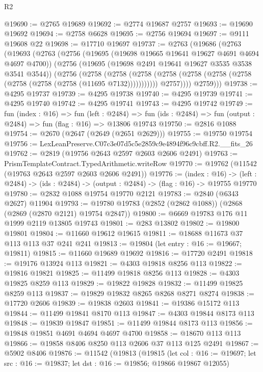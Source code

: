 \begin{lexlean}{R2}
\begin{coremodule}
@19690 := @2765 @19689
@19692 := @2774 @19687 @2757
@19693 := @19690 @19692
@19694 := @2758 @6628
@19695 := @2756 @19694
@19697 := @9111 @19608 @22
@19698 := @17710 @19697
@19737 := @2763
    (@19686
      (@2763
        (@19693
          (@2763
            (@2756
              (@19695 (@19698 @19665 @19641 @19627 @4691 @4694 @4697 @4700))
              (@2756
                (@19695 (@19698 @2491 @19641 @19627 @3535 @3538 @3541 @3544))
                (@2756
                  (@2758
                    (@2758
                      (@2758
                        (@2758 (@2758 (@2758 (@2758 (@2758 (@2758 (@2758 (@11695 @7132)))))))))))
                  @2757))))
          @2759)))
@19738 := @4295 @19737
@19739 := @4295 @19738
@19740 := @4295 @19739
@19741 := @4295 @19740
@19742 := @4295 @19741
@19743 := @4295 @19742
@19749 := fun (index : @16) =>
  fun (left : @2484) =>
  fun (ids : @2484) => fun (output : @2484) => fun (flag : @16) => @13806 @19743
@19750 := @2816 @1088
@19754 := @2670 (@2647 (@2649 (@2651 @2629)))
@19755 := @19750 @19754
@19756 := LexLeanPreserve.C07c3e07d5c5e2859c9e4894f96c9cbff.R2.__fits_26
@19762 := @2819 (@19756 @2643 @2597 @2603 @2606 @2491)
@19763 := PrismTemplateContract.TypedArithmetic.writeRow
@19770 := @19762 (@11542 (@19763 @2643 @2597 @2603 @2606 @2491))
@19776 := (index : @16) ->
  (left : @2484) -> (ids : @2484) -> (output : @2484) -> (flag : @16) -> @19755 @19770
@19780 := @2832 @1088 @19754 @19770 @2121
@19783 := @2840 (@6343 @2627) @11904
@19793 := @19780 @19783 (@2852 (@2862 @1088)) (@2868 (@2869 (@2870 @2121) @19754 @2847))
@19800 := @6669 @19783 @176 @11 @1999 @2119 @13805 @19743
@19801 := @283 @13802
@19802 := @19800 @19801
@19804 := @11660 @19612 @19615
@19811 := @18688 @11673 @37 @113 @113 @37 @241 @241
@19813 := @19804 (let entry : @16 := @19667; @19811)
@19815 := @11660 @19689 @19692
@19816 := @17720 @2491
@19818 := @19176 @13924 @113
@19821 := @4303 @19818 @8256 @113
@19822 := @19816 @19821
@19825 := @11499 @19818 @8256 @113
@19828 := @4303 @19825 @8259 @113
@19829 := @19822 @19828
@19832 := @11499 @19825 @8259 @113
@19837 := @19829 @19832 @8265 @8268 @8271 @8274
@19838 := @17720 @2606
@19839 := @19838 @2603
@19841 := @19386 @15172 @113
@19844 := @11499 @19841 @8170 @113
@19847 := @4303 @19844 @8173 @113
@19848 := @19839 @19847
@19851 := @11499 @19844 @8173 @113
@19856 := @19848 @19851 @4691 @4694 @4697 @4700
@19858 := @18670 @113 @113
@19866 := @19858 @8406 @8250 @113 @2606 @37 @113 @125 @2491
@19867 := @5902 @8406
@19876 := @11542
    (@19813
      (@19815
        (let col : @16 := @19697;
        let src : @16 := @19837; let dst : @16 := @19856; @19866 @19867 @12055)

\end{coremodule}
\end{lexlean}
